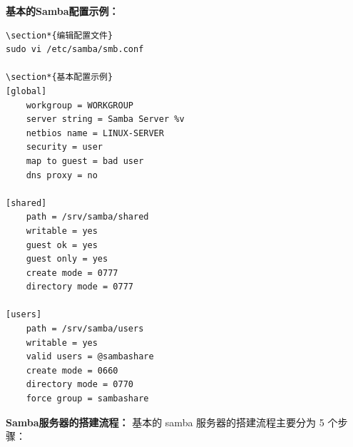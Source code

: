 \documentclass[12pt,UTF8]{ctexbook}
\begin{document}
\textbf{基本的Samba配置示例：}
\begin{verbatim}
\section*{编辑配置文件}
sudo vi /etc/samba/smb.conf

\section*{基本配置示例}
[global]
    workgroup = WORKGROUP
    server string = Samba Server %v
    netbios name = LINUX-SERVER
    security = user
    map to guest = bad user
    dns proxy = no

[shared]
    path = /srv/samba/shared
    writable = yes
    guest ok = yes
    guest only = yes
    create mode = 0777
    directory mode = 0777

[users]
    path = /srv/samba/users
    writable = yes
    valid users = @sambashare
    create mode = 0660
    directory mode = 0770
    force group = sambashare
\end{verbatim}

\textbf{Samba服务器的搭建流程：}
基本的 samba 服务器的搭建流程主要分为 5 个步骤：
\end{document}
